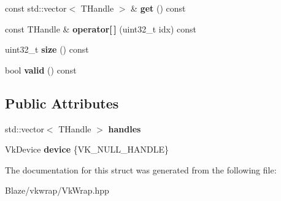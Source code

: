 \begin{DoxyCompactItemize}
\item 
\mbox{\label{structblaze_1_1vkw_1_1DeviceDependentVector_aab8ad266846c6d6aba0e1fc2fc5f3d2f}} 
const std\+::vector$<$ T\+Handle $>$ \& {\bfseries get} () const
\item 
\mbox{\label{structblaze_1_1vkw_1_1DeviceDependentVector_acb2e7178637fec2fbcd928f339517a1d}} 
const T\+Handle \& {\bfseries operator\mbox{[}$\,$\mbox{]}} (uint32\+\_\+t idx) const
\item 
\mbox{\label{structblaze_1_1vkw_1_1DeviceDependentVector_a234ab2e36b55c3b7b3c48733b033c6af}} 
uint32\+\_\+t {\bfseries size} () const
\item 
\mbox{\label{structblaze_1_1vkw_1_1DeviceDependentVector_aca5b9414c1c2a82b717bb98c822c2446}} 
bool {\bfseries valid} () const
\end{DoxyCompactItemize}
\subsection*{Public Attributes}
\begin{DoxyCompactItemize}
\item 
\mbox{\label{structblaze_1_1vkw_1_1DeviceDependentVector_a5f76d5f0fe3dc1b6d86f18c7692b7836}} 
std\+::vector$<$ T\+Handle $>$ {\bfseries handles}
\item 
\mbox{\label{structblaze_1_1vkw_1_1DeviceDependentVector_a37be1301509a33bdebebfb809207fa6b}} 
Vk\+Device {\bfseries device} \{V\+K\+\_\+\+N\+U\+L\+L\+\_\+\+H\+A\+N\+D\+LE\}
\end{DoxyCompactItemize}


The documentation for this struct was generated from the following file\+:\begin{DoxyCompactItemize}
\item 
Blaze/vkwrap/Vk\+Wrap.\+hpp\end{DoxyCompactItemize}
